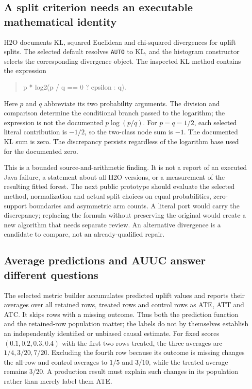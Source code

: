 \subsection{A split criterion needs an executable mathematical identity}
\label{exec20:javafx-split}

H2O documents KL, squared Euclidean and chi-squared divergences for uplift
splits. The selected default resolves \texttt{AUTO} to KL, and the histogram
constructor selects the corresponding divergence object. The inspected KL
method contains the expression
\begin{quote}
\ttfamily\small
p * log2(p / q == 0 ? epsilon : q).
\end{quote}
Here $p$ and $q$ abbreviate its two probability arguments. The division and
comparison determine the conditional branch passed to the logarithm; the
expression is not the documented $p\log(p/q)$. For $p=q=1/2$, each selected
literal contribution is $-1/2$, so the two-class node sum is $-1$. The
documented KL sum is zero. The discrepancy persists regardless of the
logarithm base used for the documented zero.
\citep{exec20_javaeffects_h2o,exec20_javaeffects_reference}

This is a bounded source-and-arithmetic finding. It is not a report of an
executed Java failure, a statement about all H2O versions, or a measurement of
the resulting fitted forest. The next public prototype should evaluate the
selected method, normalization and actual split choices on equal probabilities,
zero-support boundaries and asymmetric arm counts. A literal port would carry
the discrepancy; replacing the formula without preserving the original would
create a new algorithm that needs separate review. An alternative divergence
is a candidate to compare, not an already-qualified repair.
\citep{exec20_javaeffects_h2o,exec20_javaeffects_reference}

\subsection{Average predictions and AUUC answer different questions}
\label{exec20:javafx-metrics}

The selected metric builder accumulates predicted uplift values and reports
their averages over all retained rows, treated rows and control rows as ATE,
ATT and ATC. It skips rows with a missing outcome. Thus both the prediction
function and the retained-row population matter; the labels do not by
themselves establish an independently identified or unbiased causal estimate.
For fixed scores $(0.1,0.2,0.3,0.4)$ with the first two rows treated, the
three averages are $1/4,3/20,7/20$. Excluding the fourth row because its
outcome is missing changes the all-row and control averages to $1/5$ and
$3/10$, while the treated average remains $3/20$. A production result must
explain such changes in its population rather than merely label them ATE.
\citep{exec20_javaeffects_h2o,exec20_javaeffects_reference}

